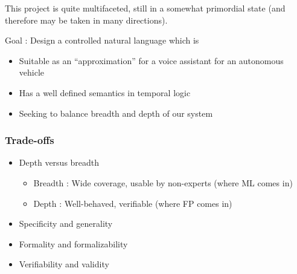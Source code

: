 \documentclass{beamer}
\begin{document}
\begin{frame}

\end{frame}



\begin{frame}
\begin{exampleblock}{}
This project is quite multifaceted, still in a somewhat primordial state (and therefore may be taken in many directions).
\end{exampleblock}

\begin{block}{}
Goal : Design a controlled natural language which is 
\end{block}

\begin{itemize}
\item Suitable as an ``approximation'' for a voice assistant for an autonomous vehicle
\item Has a well defined semantics in temporal logic
\item Seeking to balance breadth and depth of our system
\end{itemize}
\end{frame}



\begin{frame}
\frametitle{Trade-offs}
\begin{itemize}[<+->]
\item Depth versus breadth
\begin{itemize}[<+->]
\item Breadth : Wide coverage, usable by non-experts (where ML comes in)
\item Depth   : Well-behaved, verifiable (where FP comes in)
\end{itemize}
\item Specificity and generality
\item Formality and formalizability
\item Verifiability and validity
\end{itemize}
\end{frame}
\end{document}
